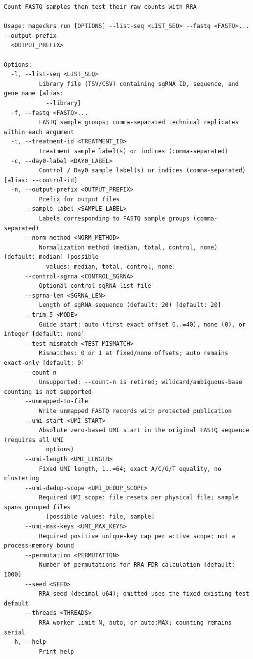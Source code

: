 \documentclass[11pt,a4paper]{article}
\begin{document}
\begin{verbatim}
Count FASTQ samples then test their raw counts with RRA

Usage: mageckrs run [OPTIONS] --list-seq <LIST_SEQ> --fastq <FASTQ>... --output-prefix
  <OUTPUT_PREFIX>

Options:
  -l, --list-seq <LIST_SEQ>
          Library file (TSV/CSV) containing sgRNA ID, sequence, and gene name [alias:
            --library]
  -f, --fastq <FASTQ>...
          FASTQ sample groups; comma-separated technical replicates within each argument
  -t, --treatment-id <TREATMENT_ID>
          Treatment sample label(s) or indices (comma-separated)
  -c, --day0-label <DAY0_LABEL>
          Control / Day0 sample label(s) or indices (comma-separated) [alias: --control-id]
  -n, --output-prefix <OUTPUT_PREFIX>
          Prefix for output files
      --sample-label <SAMPLE_LABEL>
          Labels corresponding to FASTQ sample groups (comma-separated)
      --norm-method <NORM_METHOD>
          Normalization method (median, total, control, none) [default: median] [possible
            values: median, total, control, none]
      --control-sgrna <CONTROL_SGRNA>
          Optional control sgRNA list file
      --sgrna-len <SGRNA_LEN>
          Length of sgRNA sequence (default: 20) [default: 20]
      --trim-5 <MODE>
          Guide start: auto (first exact offset 0..=40), none (0), or integer [default: none]
      --test-mismatch <TEST_MISMATCH>
          Mismatches: 0 or 1 at fixed/none offsets; auto remains exact-only [default: 0]
      --count-n
          Unsupported: --count-n is retired; wildcard/ambiguous-base counting is not supported
      --unmapped-to-file
          Write unmapped FASTQ records with protected publication
      --umi-start <UMI_START>
          Absolute zero-based UMI start in the original FASTQ sequence (requires all UMI
            options)
      --umi-length <UMI_LENGTH>
          Fixed UMI length, 1..=64; exact A/C/G/T equality, no clustering
      --umi-dedup-scope <UMI_DEDUP_SCOPE>
          Required UMI scope: file resets per physical file; sample spans grouped files
            [possible values: file, sample]
      --umi-max-keys <UMI_MAX_KEYS>
          Required positive unique-key cap per active scope; not a process-memory bound
      --permutation <PERMUTATION>
          Number of permutations for RRA FDR calculation [default: 1000]
      --seed <SEED>
          RRA seed (decimal u64); omitted uses the fixed existing test default
      --threads <THREADS>
          RRA worker limit N, auto, or auto:MAX; counting remains serial
  -h, --help
          Print help
\end{verbatim}
\end{document}
